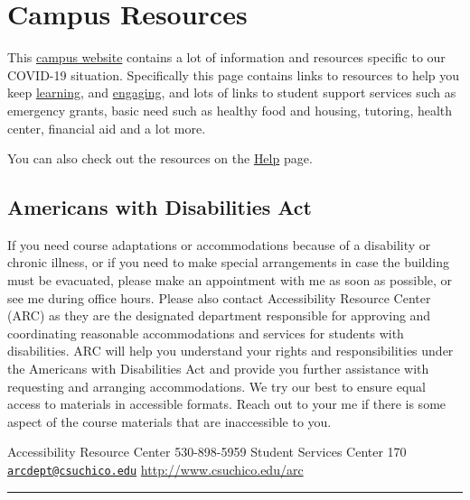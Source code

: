 \documentclass[
  letterpaper,
  DIV=11,
  numbers=noendperiod]{scrartcl}
\begin{document}
\hypertarget{campus-resources}{%
\section{Campus Resources}\label{campus-resources}}

This \href{https://www.csuchico.edu/coronavirus/students.shtml}{campus
website} contains a lot of information and resources specific to our
COVID-19 situation. Specifically this page contains links to resources
to help you keep
\href{https://www.csuchico.edu/keep-learning/index.shtml}{learning}, and
\href{https://www.csuchico.edu/keep-engaging/index.shtml}{engaging}, and
lots of links to student support services such as emergency grants,
basic need such as healthy food and housing, tutoring, health center,
financial aid and a lot more.

You can also check out the resources on the \href{help.html}{Help} page.

\hypertarget{americans-with-disabilities-act}{%
\subsection{Americans with Disabilities
Act}\label{americans-with-disabilities-act}}

If you need course adaptations or accommodations because of a disability
or chronic illness, or if you need to make special arrangements in case
the building must be evacuated, please make an appointment with me as
soon as possible, or see me during office hours. Please also contact
Accessibility Resource Center (ARC) as they are the designated
department responsible for approving and coordinating reasonable
accommodations and services for students with disabilities. ARC will
help you understand your rights and responsibilities under the Americans
with Disabilities Act and provide you further assistance with requesting
and arranging accommodations. We try our best to ensure equal access to
materials in accessible formats. Reach out to your me if there is some
aspect of the course materials that are inaccessible to you.

Accessibility Resource Center 530-898-5959 Student Services Center 170
\href{mailto:arcdept@csuchico.edu}{\nolinkurl{arcdept@csuchico.edu}}
\href{https://www.csuchico.edu/arc/}{http://www.csuchico.edu/arc}

\begin{center}\rule{0.5\linewidth}{0.5pt}\end{center}
\end{document}
